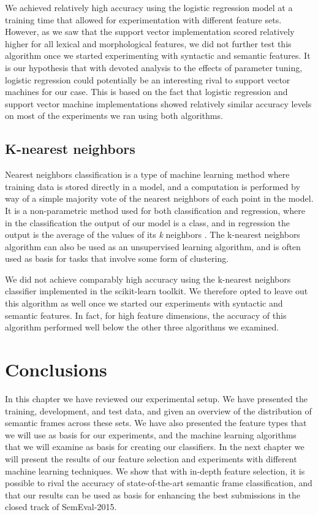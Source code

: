 We achieved relatively high accuracy using the logistic regression model at a training time that allowed for experimentation with different feature sets. However, as we saw that the support vector implementation scored relatively higher for all lexical and morphological features, we did not further test this algorithm once we started experimenting with syntactic and semantic features. It is our hypothesis that with devoted analysis to the effects of parameter tuning, logistic regression could potentially be an interesting rival to support vector machines for our case. This is based on the fact that logistic regression and support vector machine implementations showed relatively similar accuracy levels on most of the experiments we ran using both algorithms.

\subsection{K-nearest neighbors}

Nearest neighbors classification is a type of machine learning method where training data is stored directly in a model, and a computation is performed by way of a simple majority vote of the nearest neighbors of each point in the model. It is a non-parametric method used for both classification and regression, where in the classification the output of our model is a class, and in regression the output is the average of the values of its \textit{k} neighbors \cite{Altman:92}. The k-nearest neighbors algorithm can also be used as an unsupervised learning algorithm, and is often used as basis for tasks that involve some form of clustering.

We did not achieve comparably high accuracy using the k-nearest neighbors classifier implemented in the scikit-learn toolkit. We therefore opted to leave out this algorithm as well once we started our experiments with syntactic and semantic features. In fact, for high feature dimensions, the accuracy of this algorithm performed well below the other three algorithms we examined.

\section{Conclusions}

In this chapter we have reviewed our experimental setup. We have presented the training, development, and test data, and given an overview of the distribution of semantic frames across these sets. We have also presented the feature types that we will use as basis for our experiments, and the machine learning algorithms that we will examine as basis for creating our classifiers. In the next chapter we will present the results of our feature selection and experiments with different machine learning techniques. We show that with in-depth feature selection, it is possible to rival the accuracy of state-of-the-art semantic frame classification, and that our results can be used as basis for enhancing the best submissions in the closed track of SemEval-2015.